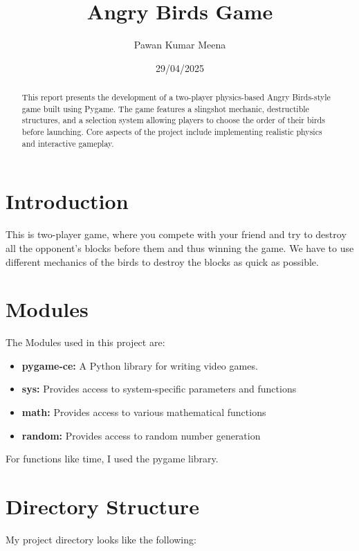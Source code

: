 \documentclass[10pt]{article}
\title{Angry Birds Game}
\author{Pawan Kumar Meena}
\date{29/04/2025}
\begin{document}
\maketitle
\begin{abstract}
    This report presents the development of a two-player physics-based Angry Birds-style game built using Pygame. The game features a slingshot mechanic, destructible structures, and a selection system allowing players to choose the order of their birds before launching. Core aspects of the project include implementing realistic physics and interactive gameplay.
\end{abstract}

\vspace{1cm}

\begin{center}
    \tableofcontents
\end{center}

\newpage

\section{Introduction}\label{sec:Introduction}
This is two-player game, where you compete with your friend and try to destroy all the opponent's blocks before them and thus winning the game. We have to use different mechanics of the birds to destroy the blocks as quick as possible.

\section{Modules}\label{sec:Modules}
The Modules used in this project are:
\begin{itemize}
    \item \textbf{pygame-ce:} A Python library for writing video games.
    \item \textbf{sys:} Provides access to system-specific parameters and functions
    \item \textbf{math:} Provides access to various mathematical functions
    \item \textbf{random:} Provides access to random number generation
\end{itemize}
For functions like time, I used the pygame library.

\section{Directory Structure}\label{sec:Directory-Structure}
My project directory looks like the following:
\end{document}
